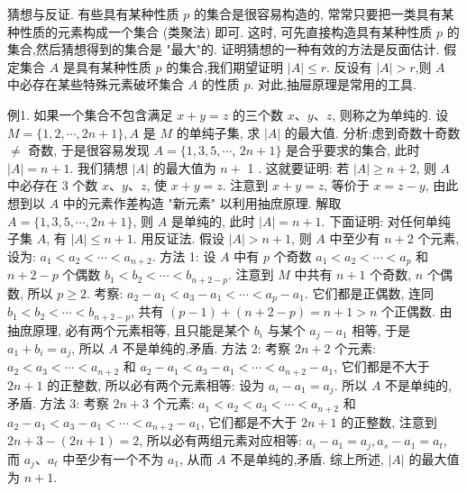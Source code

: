 
猜想与反证.
有些具有某种性质 $p$ 的集合是很容易构造的, 常常只要把一类具有某种性质的元素构成一个集合 (类聚法) 即可.
这时, 可先直接构造具有某种性质 $p$ 的集合,然后猜想得到的集合是 "最大"的.
证明猜想的一种有效的方法是反面估计.
假定集合 $A$ 是具有某种性质 $p$ 的集合,我们期望证明 $|A| \leqslant r$. 反设有 $|A|>r$,则 $A$ 中必存在某些特殊元素破坏集合 $A$ 的性质 $p$. 对此,抽屉原理是常用的工具.



例1. 如果一个集合不包含满足 $x+y=z$ 的三个数 $x 、 y 、 z$, 则称之为单纯的.
设 $M=\{1,2, \cdots, 2 n+1\}, A$ 是 $M$ 的单纯子集, 求 $|A|$ 的最大值.
分析:虑到奇数十奇数 $\neq$ 奇数, 于是很容易发现 $A=\{1,3,5, \cdots$, $2 n+1\}$ 是合乎要求的集合, 此时 $|A|=n+1$. 我们猜想 $|A|$ 的最大值为 $n+$ 1 . 这就要证明: 若 $|A| \geqslant n+2$, 则 $A$ 中必存在 3 个数 $x 、 y 、 z$, 使 $x+y=z$. 注意到 $x+y=z$, 等价于 $x=z-y$, 由此想到以 $A$ 中的元素作差构造 "新元素" 以利用抽庶原理.
解取 $A=\{1,3,5, \cdots, 2 n+1\}$, 则 $A$ 是单纯的, 此时 $|A|=n+1$. 下面证明: 对任何单纯子集 $A$, 有 $|A| \leqslant n+1$. 用反证法.
假设 $|A|>n+1$, 则 $A$ 中至少有 $n+2$ 个元素,设为: $a_1<a_2<\cdots<a_{n+2}$.
方法 1: 设 $A$ 中有 $p$ 个奇数 $a_1<a_2<\cdots<a_p$ 和 $n+2-p$ 个偶数 $b_1< b_2<\cdots<b_{n+2-p}$. 注意到 $M$ 中共有 $n+1$ 个奇数, $n$ 个偶数, 所以 $p \geqslant 2$.
考察: $a_2-a_1<a_3-a_1<\cdots<a_p-a_1$. 它们都是正偶数, 连同 $b_1< b_2<\cdots<b_{n+2-p}$, 共有 $(p-1)+(n+2-p)=n+1>n$ 个正偶数.
由抽庶原理, 必有两个元素相等, 且只能是某个 $b_i$ 与某个 $a_j-a_1$ 相等, 于是 $a_1+b_i=a_j$, 所以 $A$ 不是单纯的,矛盾.
方法 2: 考察 $2 n+2$ 个元素: $a_2<a_3<\cdots<a_{n+2}$ 和 $a_2-a_1<a_3- a_1<\cdots<a_{n+2}-a_1$, 它们都是不大于 $2 n+1$ 的正整数, 所以必有两个元素相等: 设为 $a_i-a_1=a_j$. 所以 $A$ 不是单纯的,矛盾.
方法 3: 考察 $2 n+3$ 个元素: $a_1<a_2<a_3<\cdots<a_{n+2}$ 和 $a_2-a_1<a_3- a_1<\cdots<a_{n+2}-a_1$, 它们都是不大于 $2 n+1$ 的正整数, 注意到 $2 n+3-(2 n+ 1)=2$, 所以必有两组元素对应相等: $a_i-a_1=a_j, a_s-a_1=a_t$, 而 $a_j 、 a_t$ 中至少有一个不为 $a_1$, 从而 $A$ 不是单纯的,矛盾.
综上所述, $|A|$ 的最大值为 $n+1$.



